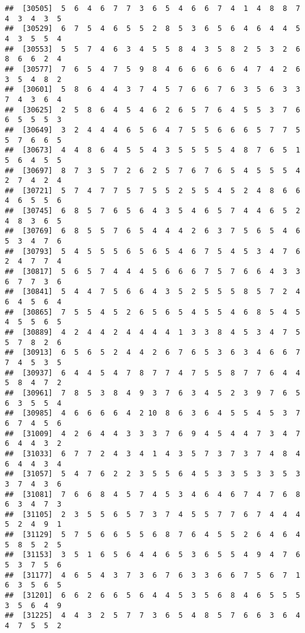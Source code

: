 \documentclass[
]{book}
\begin{document}
\begin{verbatim}
##  [30505]  5  6  4  6  7  7  3  6  5  4  6  6  7  4  1  4  8  8  7  4  3  4  3  5
##  [30529]  6  7  5  4  6  5  5  2  8  5  3  6  5  6  4  6  4  4  5  4  3  5  5  4
##  [30553]  5  5  7  4  6  3  4  5  5  8  4  3  5  8  2  5  3  2  6  8  6  6  2  4
##  [30577]  7  6  5  4  7  5  9  8  4  6  6  6  6  6  4  7  4  2  6  3  5  4  8  2
##  [30601]  5  8  6  4  4  3  7  4  5  7  6  6  7  6  3  5  6  3  3  7  4  3  6  4
##  [30625]  2  5  8  6  4  5  4  6  2  6  5  7  6  4  5  5  3  7  6  6  5  5  5  3
##  [30649]  3  2  4  4  4  6  5  6  4  7  5  5  6  6  6  5  7  7  5  5  7  6  6  5
##  [30673]  4  4  8  6  4  5  5  4  3  5  5  5  5  4  8  7  6  5  1  5  6  4  5  5
##  [30697]  8  7  3  5  7  2  6  2  5  7  6  7  6  5  4  5  5  5  4  2  7  4  2  4
##  [30721]  5  7  4  7  7  5  7  5  5  2  5  5  4  5  2  4  8  6  6  4  6  5  5  6
##  [30745]  6  8  5  7  6  5  6  4  3  5  4  6  5  7  4  4  6  5  2  4  8  3  6  5
##  [30769]  6  8  5  5  7  6  5  4  4  4  2  6  3  7  5  6  5  4  6  5  3  4  7  6
##  [30793]  5  4  5  5  5  6  5  6  5  4  6  7  5  4  5  3  4  7  6  2  4  7  7  4
##  [30817]  5  6  5  7  4  4  4  5  6  6  6  7  5  7  6  6  4  3  3  6  7  7  3  6
##  [30841]  5  4  4  7  5  6  6  4  3  5  2  5  5  5  8  5  7  2  4  6  4  5  6  4
##  [30865]  7  5  5  4  5  2  6  5  6  5  4  5  5  4  6  8  5  4  5  4  5  5  6  5
##  [30889]  4  2  4  4  2  4  4  4  4  1  3  3  8  4  5  3  4  7  5  5  7  8  2  6
##  [30913]  6  5  6  5  2  4  4  2  6  7  6  5  3  6  3  4  6  6  7  7  4  5  3  5
##  [30937]  6  4  4  5  4  7  8  7  7  4  7  5  5  8  7  7  6  4  4  5  8  4  7  2
##  [30961]  7  8  5  3  8  4  9  3  7  6  3  4  5  2  3  9  7  6  5  6  3  5  5  4
##  [30985]  4  6  6  6  6  4  2 10  8  6  3  6  4  5  5  4  5  3  7  6  7  4  5  6
##  [31009]  4  2  6  4  4  3  3  3  7  6  9  4  5  4  4  7  3  4  7  6  4  4  3  2
##  [31033]  6  7  7  2  4  3  4  1  4  3  5  7  3  7  3  7  4  8  4  6  4  4  3  4
##  [31057]  5  4  7  6  2  2  3  5  5  6  4  5  3  3  5  3  3  5  3  3  7  4  3  6
##  [31081]  7  6  6  8  4  5  7  4  5  3  4  6  4  6  7  4  7  6  8  6  3  4  7  3
##  [31105]  2  3  5  5  6  5  7  3  7  4  5  5  7  7  6  7  4  4  4  5  2  4  9  1
##  [31129]  5  7  5  6  6  5  5  6  8  7  6  4  5  5  2  6  4  6  4  5  8  5  2  5
##  [31153]  3  5  1  6  5  6  4  4  6  5  3  6  5  5  4  9  4  7  6  5  3  7  5  6
##  [31177]  4  6  5  4  3  7  3  6  7  6  3  3  6  6  7  5  6  7  1  6  3  5  6  5
##  [31201]  6  6  2  6  6  5  6  4  4  5  3  5  6  8  4  6  5  5  5  3  5  6  4  9
##  [31225]  4  4  3  2  5  7  7  3  6  5  4  8  5  7  6  6  3  6  4  4  7  5  5  2

\end{verbatim}
\end{document}
